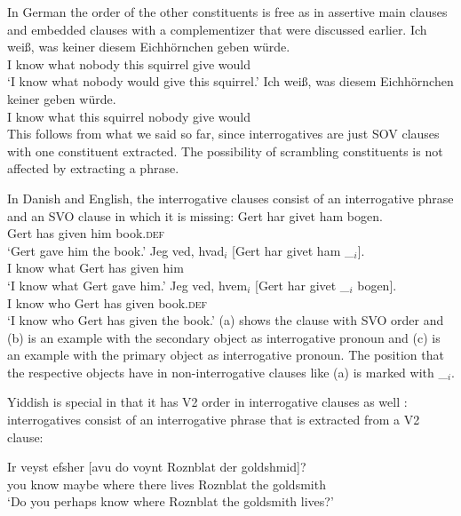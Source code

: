 In German the order of the other constituents is free as in assertive main clauses and embedded
clauses with a complementizer that were discussed earlier. 
\eal
\ex
\gll Ich weiß, was keiner diesem Eichhörnchen geben würde.\\
     I know    what nobody this squirrel give would\\
\glt `I know what nobody would give this squirrel.'
\ex 
\gll Ich weiß, was diesem Eichhörnchen keiner geben würde.\\
     I know what this squirrel nobody give would\\
\zl
This follows from what we said so far, since interrogatives are just SOV clauses with one
constituent extracted. The possibility of scrambling constituents is not affected by extracting a phrase.

In Danish and English, the interrogative clauses consist of an interrogative phrase and an SVO clause
in which it is missing:
\eal
\ex 
\gll Gert har givet ham bogen.\\
     Gert has given him book.\textsc{def}\\
\glt `Gert gave him the book.'
\ex
\gll Jeg ved, hvad$_i$ [Gert har givet ham \_$_i$].\\
     I know what \spacebr{}Gert has given him\\
\glt `I know what Gert gave him.'
\ex
\gll Jeg ved, hvem$_i$ [Gert har givet \_$_i$   bogen].\\
     I know who        \spacebr{}Gert has given {} book.\textsc{def}\\
\glt `I know who Gert has given the book.'
\zl
(a) shows the clause with SVO order and (b) is an example with the secondary object as
interrogative pronoun and (c) is an example with the primary object as interrogative
pronoun. The position that the respective objects have in non-interrogative clauses like (a)
is marked with \_$_i$.

Yiddish is special in that it has V2 order in interrogative clauses as well \citep[Sections~4.1, 4.2]{Diesing90a}: interrogatives
consist of an interrogative phrase that is extracted from a V2 clause:

\ea
\gll Ir veyst efsher [avu            do    voynt Roznblat   der goldshmid]?\footnotemark\\
     you know maybe  \spacebr{}where there lives Roznblat the goldsmith\\
\glt `Do you perhaps know where Roznblat the goldsmith lives?' 
\z
%

